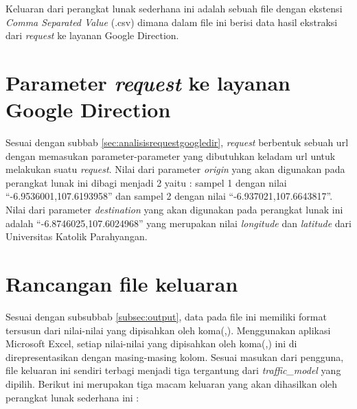 Keluaran dari perangkat lunak sederhana ini adalah sebuah file dengan ekstensi \textit{Comma Separated Value} (.csv) dimana dalam file ini berisi data hasil ekstraksi dari \textit{request} ke layanan Google Direction.

\section{Parameter \textit{request} ke layanan Google Direction}
\label{sec:parameterrequest}

Sesuai dengan subbab \ref{sec:analisisrequestgoogledir}, \textit{request} berbentuk sebuah url dengan memasukan parameter-parameter yang dibutuhkan keladam url untuk melakukan suatu \textit{request}. Nilai dari parameter \textit{origin} yang akan digunakan pada perangkat lunak ini dibagi menjadi 2 yaitu : sampel 1 dengan nilai "`-6.9536001,107.6193958"' dan sampel 2 dengan nilai "`-6.937021,107.6643817"'. Nilai dari parameter \textit{destination} yang akan digunakan pada perangkat lunak ini adalah "`-6.8746025,107.6024968"' yang merupakan nilai \textit{longitude} dan \textit{latitude} dari Universitas Katolik Parahyangan. 

\section{Rancangan file keluaran}
\label{sec:rancanganfile}

Sesuai dengan subsubbab \ref{subsec:output}, data pada file ini memiliki format tersusun dari nilai-nilai yang dipisahkan oleh koma(,). Menggunakan aplikasi Microsoft Excel, setiap nilai-nilai yang dipisahkan oleh koma(,) ini di direpresentasikan dengan masing-masing kolom. Sesuai masukan dari pengguna, file keluaran ini sendiri terbagi menjadi tiga tergantung dari \textit{traffic\_model} yang dipilih. Berikut ini merupakan tiga macam keluaran yang akan dihasilkan oleh perangkat lunak sederhana ini :

